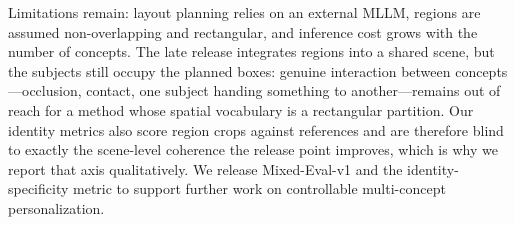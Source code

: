 \documentclass[10pt,twocolumn,letterpaper]{article}
\begin{document}
Limitations remain: layout planning relies on an external MLLM,
regions are assumed non-overlapping and rectangular, and inference cost
grows with the number of concepts.  The late release integrates regions
into a shared scene, but the subjects still occupy the planned boxes:
genuine interaction between concepts---occlusion, contact, one subject
handing something to another---remains out of reach for a method whose
spatial vocabulary is a rectangular partition.  Our identity metrics
also score region crops against references and are therefore blind to
exactly the scene-level coherence the release point improves, which is
why we report that axis qualitatively.  We release Mixed-Eval-v1 and
the identity-specificity metric to support further work on controllable
multi-concept personalization.

{\small


}
\end{document}
